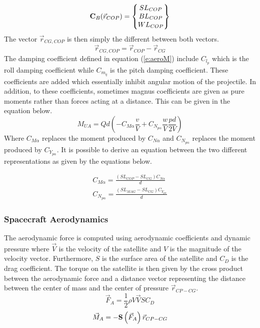 \documentclass{article}
\begin{document}
\begin{equation}
{\bf C}_B(\vec{r}_{COP}) = \begin{Bmatrix} SL_{COP} \\ BL_{COP} \\ WL_{COP} \end{Bmatrix}
\end{equation}
The vector $\vec{r}_{CG,COP}$ is then simply the different between
both vectors.
\begin{equation}
\vec{r}_{CG,COP} = \vec{r}_{COP}-\vec{r}_{CG}
\end{equation}
The damping coefficient defined in equation (\ref{e:aeroM})
include $C_{l_p}$ which is the roll damping coefficient while $C_{m_q}$ is the pitch damping
coefficient. These coefficients are added which essentially inhibit
angular motion of the projectile. In addition, to these coefficients,
sometimes magnus coefficients are given as pure moments rather 
than forces acting at a distance. This can be given in the equation
below. 
\begin{equation}
M_{UA} = Qd (-C_{M\alpha}\frac{v}{V} + C_{N_{p\alpha}}\frac{w}{V}\frac{pd}{2V})
\end{equation}
Where $C_{M\alpha}$ replaces the moment produced by $C_{N\alpha}$ and
$C_{N_{p\alpha}}$ replaces the moment produced by
$C_{Y_{p\alpha}}$. It is possible to derive an equation between the
two different representations as given by the equations below.

\begin{equation}
\begin{matrix}
C_{M\alpha} = \frac{(SL_{COP}-SL_{CG})C_{N\alpha}}{d} \\
C_{N_{p\alpha}} = \frac{(SL_{MAG}-SL_{CG})C_{Y_{p\alpha}}}{d}
\end{matrix}
\end{equation}

\subsubsection{Spacecraft Aerodynamics}

The aerodynamic force is computed using aerodynamic coefficients and
dynamic pressure where $\vec{V}$ is the velocity of the satellite and
$V$ is the magnitude of the velocity vector. Furthermore, $S$ is the
surface area of the satellite and $C_D$ is the drag coefficient. The
torque on the satellite is then given by the cross product between the
aerodynamic force and a distance vector representing the distance
between the center of mass and the center of pressure
$\vec{r}_{CP-CG}$.
\begin{equation}
  \vec{F}_A = \frac{1}{2}\rho V\vec{V}S C_D
\end{equation}
\begin{equation}
    \vec{M}_A = -{\bf S}\left(\vec{F}_A\right)\vec{r}_{CP-CG}
\end{equation}
\end{document}

